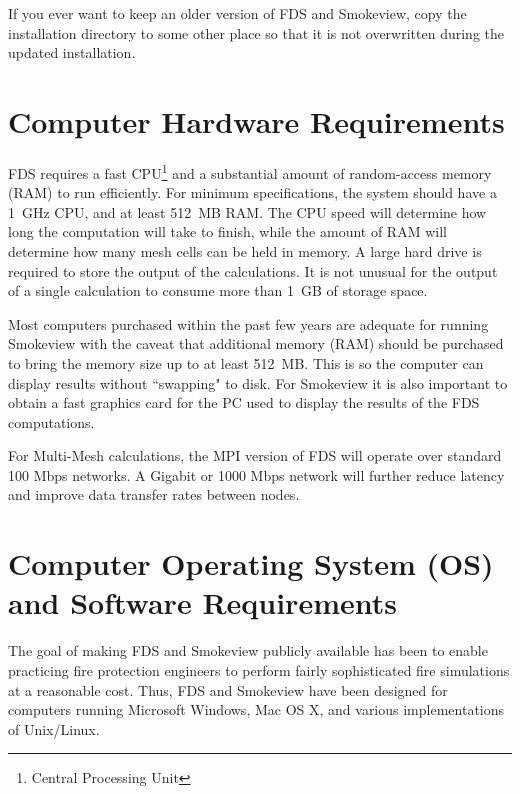 \documentclass[11pt]{book}
\begin{document}
\begin{warning}
\noindent
If you ever want to keep an older version of FDS and Smokeview, copy the installation directory to some other
place so that it is not overwritten during the updated installation.
\end{warning}

\section{Computer Hardware Requirements}

FDS requires a fast CPU\footnote{Central Processing Unit} and a substantial amount of random-access memory (RAM) to run efficiently.
For minimum specifications, the system should have a 1~GHz CPU, and at least 512~MB RAM.
The CPU speed will determine how long the computation will take to finish, while the amount
of RAM will determine how many mesh cells can be held in memory.
A large hard drive is required to store the output of the calculations. It is not unusual for
the output of a single calculation to consume more than 1~GB of storage space.

Most computers purchased within the past few years are adequate for running Smokeview
with the caveat that additional memory (RAM) should be purchased to bring the
memory size up to at least 512~MB. This is so the computer can display results without
``swapping" to disk. For Smokeview it is also important to obtain a fast graphics card
for the PC used to display the results of the FDS computations.

For Multi-Mesh calculations, the MPI version of FDS will operate over standard 100 Mbps networks.
A Gigabit or 1000 Mbps network will further reduce latency and improve data transfer rates between nodes.


\section{Computer Operating System (OS) and Software Requirements}

The goal of making FDS and Smokeview publicly available has been to enable
practicing fire protection engineers to perform fairly sophisticated
fire simulations at a reasonable cost. Thus, FDS and Smokeview have been
designed for computers running Microsoft Windows, Mac OS X, and various
implementations of Unix/Linux.
\end{document}
